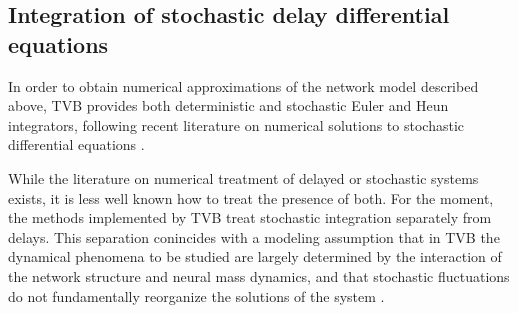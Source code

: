 \subsection{Integration of stochastic delay differential equations}

	In order to obtain numerical approximations of the network model 
	described above, TVB provides both deterministic and stochastic
	Euler and Heun integrators,
	following recent literature on numerical solutions to stochastic
	differential equations \cite{Kloeden_1995,Mannella_2002,Mannella_1989}.

	While the literature on numerical treatment of delayed or 
	stochastic systems exists, it is less well known how to treat 
	the presence of both. For the moment, the methods implemented by TVB
	treat stochastic integration separately from delays. 
	This separation conincides with a modeling assumption that in
	TVB the dynamical phenomena to be studied are largely determined
	by the interaction of the network structure and neural mass dynamics, 
	and that stochastic fluctuations do not fundamentally reorganize the
	solutions of the system \cite{Ghosh_2008,Deco_2009,Deco_2011,Deco_Senden_2012}.

